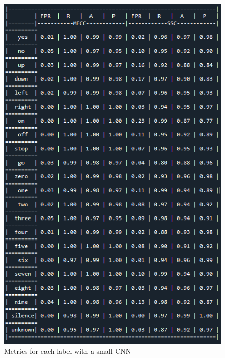 \begin{appendices}
\begin{figure}[h!]
    \includegraphics[width=1\textwidth]{chapters/pictures/table_small.PNG}
    \caption{Metrics for each label with a small CNN}
    \label{fig:table_small}
\end{figure}
\newpage
\begin{figure}[h!]
    \centering

\end{figure}
\end{appendices}

